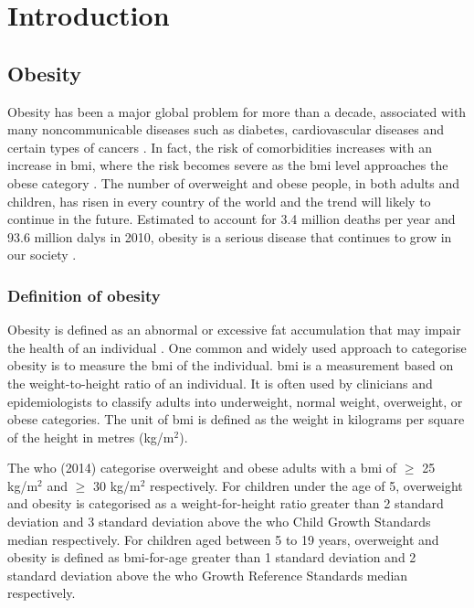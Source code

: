 \chapter{Introduction}
\label{ch:intro}

\section{Obesity}
\label{sec:obesity}

Obesity has been a major global problem for more than a decade, associated with many noncommunicable diseases such as diabetes, cardiovascular diseases and certain types of cancers \citep{WHO2014}.
In fact, the risk of comorbidities increases with an increase in \gls{bmi}, where the risk becomes severe as the \gls{bmi} level approaches the obese category \citep{WHO2000}.
The number of overweight and obese people, in both adults and children, has risen in every country of the world and the trend will likely to continue in the future.
Estimated to account for 3.4 million deaths per year and 93.6 million \glspl{daly} in 2010, obesity is a serious disease that continues to grow in our society \citep{Lim2012}.

\subsection{Definition of obesity}
\label{sub:definition_of_obesity}

Obesity is defined as an abnormal or excessive fat accumulation that may impair the health of an individual \citep{Garrow1988}.
One common and widely used approach to categorise obesity is to measure the \gls{bmi} of the individual.
\gls{bmi} is a measurement based on the weight-to-height ratio of an individual.
It is often used by clinicians and epidemiologists to classify adults into underweight, normal weight, overweight, or obese categories.
The unit of \gls{bmi} is defined as the weight in kilograms per square of the height in metres (kg/m$^2$).

The \gls{who} (2014) categorise overweight and obese adults  with a \gls{bmi} of  $\geq$ 25 kg/m$^2$ and $\geq$ 30 kg/m$^2$ respectively.
For children under the age of 5, overweight and obesity is categorised as a  weight-for-height ratio greater than 2 standard deviation and 3 standard deviation above the \gls{who} Child Growth Standards median respectively.
For children aged between 5 to 19 years, overweight and obesity is defined as \gls{bmi}-for-age greater than 1 standard deviation and 2 standard deviation above the \gls{who} Growth Reference Standards median respectively.

